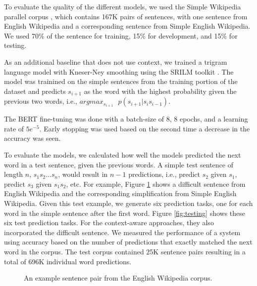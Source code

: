 \documentclass[11pt]{article}
\begin{document}
To evaluate the quality of the different models, we used the Simple Wikipedia parallel corpus \cite{kauchak2013improving}, which contains 167K pairs of sentences, with one sentence from English Wikipedia and a corresponding sentence from Simple English Wikipedia.  We used 70\% of the sentence for training, 15\% for development, and 15\% for testing.

As an additional baseline that does not use context, we trained a trigram language model with Kneser-Ney smoothing using the SRILM toolkit \cite{stolcke2002srilm}.  The model was trainined on the simple sentences from the training portion of the dataset and predicts $s_{i+1}$ as the word with the highest probability given the previous two words, i.e., $argmax_{s_{i+1}}\mbox{ } p(s_{i+1}| s_i s_{i-1})$.

The BERT fine-tuning was done with a
batch-size of 8, 8 epochs, and a learning rate of $5e^{-5}$. Early stopping was used based on the second time a decrease in the accuracy was seen.

To evaluate the models, we calculated how well the models predicted the next word in a test sentence, given the previous words.  A simple test sentence of length $n$, $s_1 s_2 ... s_n$, would result in $n-1$ predictions, i.e., predict $s_2$ given $s_1$, predict $s_3$ given $s_1 s_2$, etc.  For example, Figure \ref{fig:testexample} shows a difficult sentence from English Wikipedia and the corresponding simplification from Simple English Wikipedia.  Given this test example, we generate six prediction tasks, one for each word in the simple sentence after the first word.  Figure \ref{fig:testing} shows these six test prediction tasks.  For the context-aware approaches, they also incorporated the difficult sentence. We measured the performance of a system using accuracy based on the number of predictions that exactly matched the next word in the corpus.  The test corpus contained 25K sentence pairs resulting in a total of 696K individual word predictions.

\begin{figure}
    \centering
    \caption{An example sentence pair from the English Wikipedia corpus.}
    \label{fig:testexample}
\end{figure}
\end{document}
